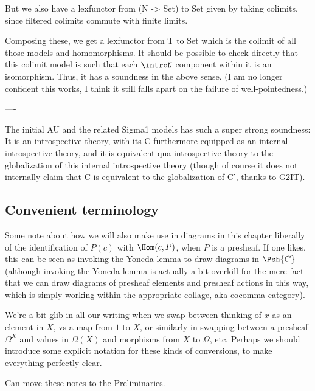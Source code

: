 But we also have a lexfunctor from (N -> Set) to Set given by taking colimits, since filtered colimits commute with finite limits.

Composing these, we get a lexfunctor from T to Set which is the colimit of all those models and homomorphisms. It should be possible to check directly that this colimit model is such that each $\introN$ component within it is an isomorphism. Thus, it has a soundness in the above sense. (I am no longer confident this works, I think it still falls apart on the failure of well-pointedness.)

----

The initial AU and the related Sigma1 models has such a super strong soundness: It is an introspective theory, with its C furthermore equipped as an internal introspective theory, and it is equivalent qua introspective theory to the globalization of this internal introspective theory (though of course it does not internally claim that C is equivalent to the globalization of C', thanks to G2IT).

\subsection{Convenient terminology}
\begin{TODOblock}
Some note about how we will also make use in diagrams in this chapter liberally of the identification of $P(c)$ with $\Hom(c, P)$, when $P$ is a presheaf. If one likes, this can be seen as invoking the Yoneda lemma to draw diagrams in $\Psh{C}$ (although invoking the Yoneda lemma is actually a bit overkill for the mere fact that we can draw diagrams of presheaf elements and presheaf actions in this way, which is simply working within the appropriate collage, aka cocomma category).

We're a bit glib in all our writing when we swap between thinking of $x$ as an element in $X$, vs a map from $1$ to $X$, or similarly in swapping between a presheaf $\Omega^X$ and values in $\Omega(X)$ and morphisms from $X$ to $\Omega$, etc. Perhaps we should introduce some explicit notation for these kinds of conversions, to make everything perfectly clear.

Can move these notes to the Preliminaries.
\end{TODOblock}

\fileend